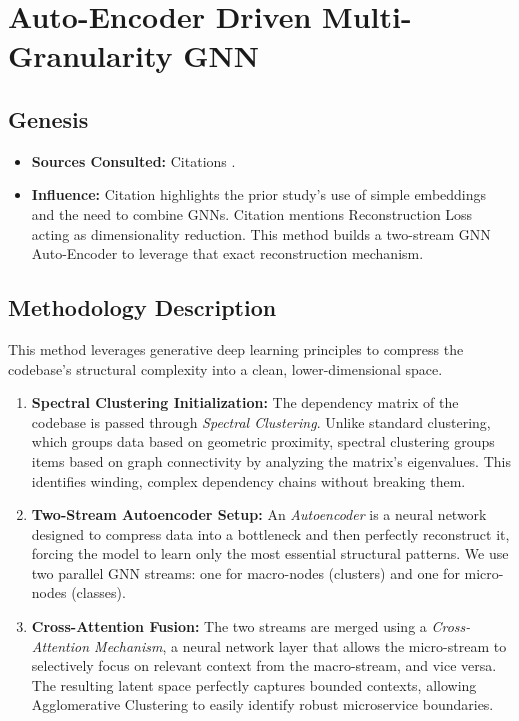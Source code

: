 \documentclass[12pt, a4paper]{article}
\begin{document}
\clearpage
\section{Auto-Encoder Driven Multi-Granularity GNN}

\subsection{Genesis}
\begin{itemize}
    \item \textbf{Sources Consulted:} Citations \cite{mathai2022, lin2023, bolanowski2022, kalia2021}.
    \item \textbf{Influence:} Citation \cite{mathai2022} highlights the prior study's use of simple embeddings and the need to combine GNNs. Citation \cite{bolanowski2022} mentions Reconstruction Loss acting as dimensionality reduction. This method builds a two-stream GNN Auto-Encoder to leverage that exact reconstruction mechanism.
\end{itemize}

\subsection{Methodology Description}
This method leverages generative deep learning principles to compress the codebase's structural complexity into a clean, lower-dimensional space.
\begin{enumerate}
    \item \textbf{Spectral Clustering Initialization:} The dependency matrix of the codebase is passed through \textit{Spectral Clustering}. Unlike standard clustering, which groups data based on geometric proximity, spectral clustering groups items based on graph connectivity by analyzing the matrix's eigenvalues. This identifies winding, complex dependency chains without breaking them.
    \item \textbf{Two-Stream Autoencoder Setup:} An \textit{Autoencoder} is a neural network designed to compress data into a bottleneck and then perfectly reconstruct it, forcing the model to learn only the most essential structural patterns. We use two parallel GNN streams: one for macro-nodes (clusters) and one for micro-nodes (classes).
    \item \textbf{Cross-Attention Fusion:} The two streams are merged using a \textit{Cross-Attention Mechanism}, a neural network layer that allows the micro-stream to selectively focus on relevant context from the macro-stream, and vice versa. The resulting latent space perfectly captures bounded contexts, allowing Agglomerative Clustering to easily identify robust microservice boundaries.
\end{enumerate}
\end{document}
